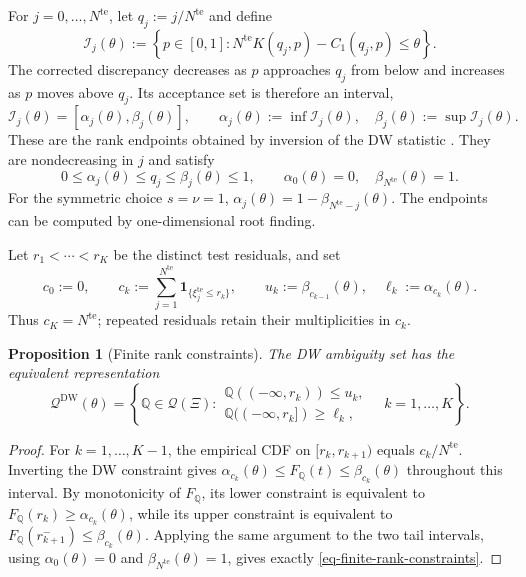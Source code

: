 \documentclass[review,11pt,3p,authoryear,nopreprintline]{elsarticle}
\newtheorem{proposition}{Proposition}
\begin{document}
For $j=0,\ldots,N^{\mathrm{te}}$, let $q_j:=j/N^{\mathrm{te}}$ and define
\begin{equation}
  \mathcal I_j(\theta):=
  \left\{p\in[0,1]:
  N^{\mathrm{te}}K(q_j,p)-C_1(q_j,p)\le\theta\right\}.
  \label{eq-dw-rank-acceptance}
\end{equation}
The corrected discrepancy decreases as $p$ approaches $q_j$ from below and increases as $p$ moves above $q_j$. Its acceptance set is therefore an interval,
\begin{equation}
  \mathcal I_j(\theta)=[\alpha_j(\theta),\beta_j(\theta)],
  \qquad
  \alpha_j(\theta):=\inf\mathcal I_j(\theta),\quad
  \beta_j(\theta):=\sup\mathcal I_j(\theta).
  \label{eq-dw-rank-endpoints}
\end{equation}
These are the rank endpoints obtained by inversion of the DW statistic \citep{L.J23}. They are nondecreasing in $j$ and satisfy
\[
  0\le\alpha_j(\theta)\le q_j\le\beta_j(\theta)\le1,
  \qquad
  \alpha_0(\theta)=0,\quad
  \beta_{N^{\mathrm{te}}}(\theta)=1.
\]
For the symmetric choice $s=\nu=1$, $\alpha_j(\theta)=1-\beta_{N^{\mathrm{te}}-j}(\theta)$. The endpoints can be computed by one-dimensional root finding.

Let $r_1<\cdots<r_K$ be the distinct test residuals, and set
\begin{equation}
  c_0:=0,\qquad
  c_k:=\sum_{j=1}^{N^{\mathrm{te}}}\mathbf1_{\{\xi_j^{\mathrm{te}}\le r_k\}},
  \qquad
  u_k:=\beta_{c_{k-1}}(\theta),\quad
  \ell_k:=\alpha_{c_k}(\theta).
  \label{eq-dw-counts-and-levels}
\end{equation}
Thus $c_K=N^{\mathrm{te}}$; repeated residuals retain their multiplicities in $c_k$.

\begin{proposition}[Finite rank constraints]
  \label{prop-finite-rank-constraints}
  The DW ambiguity set has the equivalent representation
  \begin{equation}
    \mathscr Q^{\mathrm{DW}}(\theta)=
    \left\{\mathbb Q\in\mathcal Q(\Xi):
    \begin{array}{ll}
      \mathbb Q((-\infty,r_k))\le u_k,\\
      \mathbb Q((-\infty,r_k])\ge\ell_k,
    \end{array}
    \quad k=1,\ldots,K\right\}.
    \label{eq-finite-rank-constraints}
  \end{equation}
\end{proposition}
\begin{proof}
  For $k=1,\ldots,K-1$, the empirical CDF on $[r_k,r_{k+1})$ equals $c_k/N^{\mathrm{te}}$. Inverting the DW constraint gives
  $\alpha_{c_k}(\theta)\le F_{\mathbb Q}(t)\le\beta_{c_k}(\theta)$ throughout this interval. By monotonicity of $F_{\mathbb Q}$, its lower constraint is equivalent to
  $F_{\mathbb Q}(r_k)\ge\alpha_{c_k}(\theta)$, while its upper constraint is equivalent to
  $F_{\mathbb Q}(r_{k+1}^-)\le\beta_{c_k}(\theta)$. Applying the same argument to the two tail intervals, using $\alpha_0(\theta)=0$ and $\beta_{N^{\mathrm{te}}}(\theta)=1$, gives exactly \eqref{eq-finite-rank-constraints}.
\end{proof}
\end{document}

